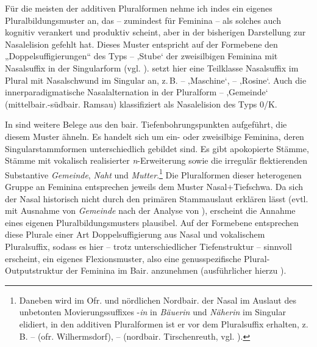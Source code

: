 Für die meisten der additiven Pluralformen nehme ich indes ein eigenes Pluralbildungsmuster an, das -- zumindest für Feminina -- als solches auch kognitiv verankert und produktiv scheint, aber in der bisherigen Darstellung zur Nasalelision gefehlt hat. Dieses Muster entspricht auf der Formebene den „Doppelsuffigierungen“ des Typs  --  ‚Stube‘ der zweisilbigen Feminina mit Nasalsuffix in der Singularform (vgl. ). \citet[154]{Rowley1997} setzt hier eine Teilklasse Nasalsuffix im Plural mit Nasalschwund im Singular an, z.\,B.  --  ‚Maschine‘,  --  ‚Rosine‘. Auch die innerparadigmatische Nasalalternation in der Pluralform  --  ‚Gemeinde‘ (mittelbair.-südbair. Ramsau) klassifiziert \citet[154]{Rowley1997} als Nasalelision des Typs 0/K.

In 	 sind weitere Belege aus den bair. Tiefenbohrungspunkten aufgeführt, die diesem Muster ähneln. Es handelt sich um ein- oder zweisilbige Feminina, deren Singularstammformen unterschiedlich gebildet sind. Es gibt apokopierte Stämme, Stämme mit vokalisch realisierter \textit{n}{}-Erweiterung sowie die irregulär flektierenden Substantive \textit{Gemeinde}, \textit{Naht} und \textit{Mutter}.\footnote{Daneben wird im Ofr. und nördlichen Nordbair. der Nasal im Auslaut des unbetonten Movierungssuffixes -\textit{in} in \textit{Bäuerin} und \textit{Näherin} im Singular elidiert, in den additiven Pluralformen ist er vor dem Pluralsuffix erhalten, z. B.  --  (ofr. Wilhermsdorf),  --  (nordbair. Tirschenreuth, vgl. ).} Die Pluralformen dieser heterogenen Gruppe an Feminina entsprechen jeweils dem Muster Nasal+Tiefschwa. Da sich der Nasal historisch nicht durch den primären Stammauslaut erklären lässt (evtl. mit Ausnahme von \textit{Gemeinde} nach der Analyse von \citealt[154]{Rowley1997}), erscheint die Annahme eines eigenen Pluralbildungsmusters plausibel. Auf der Formebene entsprechen diese Plurale einer Art Doppelsuffigierung aus Nasal und vokalischem Pluralsuffix, sodass es hier -- trotz unterschiedlicher Tiefenstruktur -- sinnvoll erscheint, ein eigenes Flexionsmuster, also eine genusspezifische Plural-Outputstruktur der Feminina im Bair. anzunehmen (ausführlicher hierzu ).


